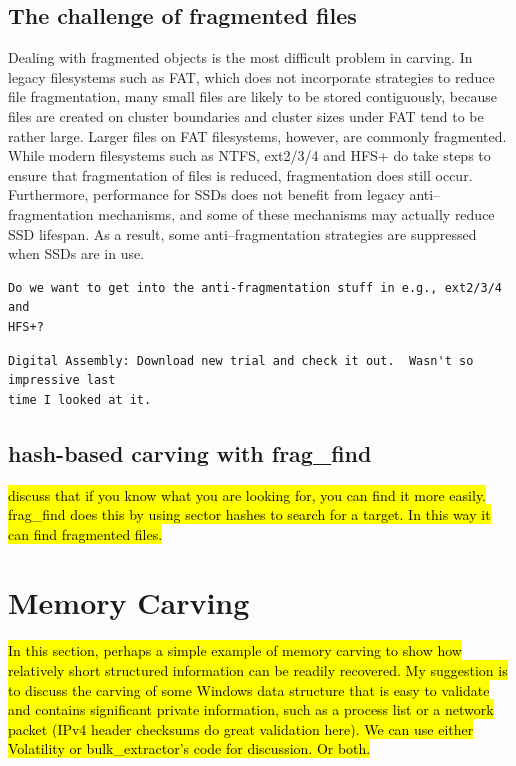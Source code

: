 \subsection{The challenge of fragmented files}




Dealing with fragmented objects is the most difficult problem in
carving.  In legacy filesystems such as FAT, which does not
incorporate strategies to reduce file fragmentation, many small files
are likely to be stored contiguously, because files are created on
cluster boundaries and cluster sizes under FAT tend to be rather
large.  Larger files on FAT filesystems, however, are commonly
fragmented\cite{dfrws2007:SimsonLGarfinkel}.  While modern filesystems
such as NTFS, ext2/3/4 and HFS+ do take steps to ensure that
fragmentation of files is reduced, fragmentation does still occur.
Furthermore, performance for SSDs does not benefit from legacy
anti--fragmentation mechanisms, and some of these mechanisms may
actually reduce SSD lifespan.  As a result, some anti--fragmentation
strategies are suppressed when SSDs are in use.

\begin{Verbatim}
Do we want to get into the anti-fragmentation stuff in e.g., ext2/3/4 and 
HFS+?
\end{Verbatim}

\begin{Verbatim}
Digital Assembly: Download new trial and check it out.  Wasn't so impressive last
time I looked at it.
\end{Verbatim}

\subsection{hash-based carving with frag\_find}

\hl{discuss that if you know what you are looking for, you can find it
  more easily. frag\_find does this by using sector hashes to search
  for a target. In this way it can find fragmented files.}


\section{Memory Carving}

\hl{In this section, perhaps a simple example of memory carving to
  show how relatively short structured information can be readily
  recovered. My suggestion is to discuss the carving of some Windows
  data structure that is easy to validate and contains significant
  private information, such as a process list or a network packet
  (IPv4 header checksums do great validation here). We can use either
  Volatility or bulk\_extractor's code for discussion. Or both. }

